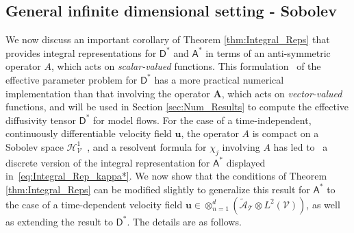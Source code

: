 \documentclass[leqno,onefignum,onetabnum]{siamltex1213}
\newcommand{\Ab}{\mathbf{A}}
\newcommand{\Tc}{\mathcal{T}}
\newcommand{\Vc}{\mathcal{V}}
\newcommand{\Dm}{\mathsf{D}}
\newcommand{\Am}{\mathsf{A}}
\newcommand{\Hs}{\mathscr{H}}
\newcommand{\As}{\mathscr{A}}
\newcommand{\vecu}{\boldsymbol{u}}
\begin{document}
\subsection{General infinite dimensional setting - Sobolev}
\label{sec:Integral_Rep_General_Sobolev}
%
We now discuss an important corollary of Theorem
\ref{thm:Integral_Reps} that provides integral
representations for $\Dm^*$ and $\Am^*$ in terms of an
anti-symmetric operator $A$, which acts on \emph{scalar-valued}
functions. This
formulation~\cite{Pavliotis:PHD_Thesis,Bhattacharya:AAP:1999:951} of
the effective 
parameter problem for $\Dm^*$ has a more practical numerical
implementation than that involving the operator $\Ab$, which acts on
\emph{vector-valued} functions, and will be used in Section
\ref{sec:Num_Results} to compute the effective diffusivity tensor
$\Dm^*$ for model flows. For the case of a time-independent,
continuously differentiable velocity field
$\vecu $, the operator $A$ is compact on a Sobolev space
$\Hs^1_{\Vc}$~\cite{Bhattacharya:AAP:1999:951}, and a resolvent
formula for $\chi_j$ 
involving $A$ has led to~\cite{Pavliotis:PHD_Thesis} a discrete 
version of the integral representation for $\Am^*$ displayed
in~\eqref{eq:Integral_Rep_kappa*}. We now show that the conditions of 
Theorem \ref{thm:Integral_Reps} can be modified slightly to generalize
this result for $\Am^*$ to the case of a time-dependent velocity
field $\vecu \in\otimes_{n=1}^d(\tilde{\As}_{\Tc}\otimes L^2(\Vc))$, as well as
extending the result to $\Dm^*$. The details are as follows.     
\end{document}
